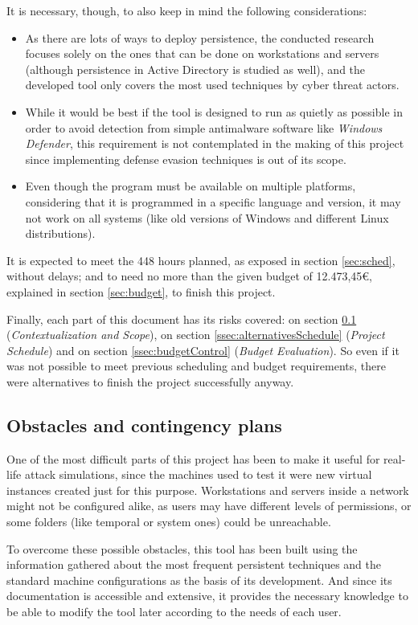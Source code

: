 It is necessary, though, to also keep in mind the following considerations:
\begin{itemize}
\item As there are lots of ways to deploy persistence, the conducted research focuses solely on the ones that can be done on workstations and servers (although persistence in Active Directory is studied as well), and the developed tool only covers the most used techniques by cyber threat actors.
\item While it would be best if the tool is designed to run as quietly as possible in order to avoid detection from simple antimalware software like \textit{Windows Defender}, this requirement is not contemplated in the making of this project since implementing defense evasion techniques is out of its scope.
\item Even though the program must be available on multiple platforms, considering that it is programmed in a specific language and version, it may not work on all systems (like old versions of Windows and different Linux distributions).
\end{itemize}

It is expected to meet the 448 hours planned, as exposed in section \ref{sec:sched}, without delays; and to need no more than the given budget of 12.473,45€, explained in section \ref{sec:budget}, to finish this project.

Finally, each part of this document has its risks covered: on section \ref{ssec:obstacles} (\textit{Contextualization and Scope}), on section \ref{ssec:alternativesSchedule} (\textit{Project Schedule}) and on section \ref{ssec:budgetControl} (\textit{Budget Evaluation}). So even if it was not possible to meet previous scheduling and budget requirements, there were alternatives to finish the project successfully anyway.


\subsection{Obstacles and contingency plans}
\label{ssec:obstacles}
One of the most difficult parts of this project has been to make it useful for real-life attack simulations, since the machines used to test it were new virtual instances created just for this purpose.
Workstations and servers inside a network might not be configured alike, as users may have different levels of permissions, or some folders (like temporal or system ones) could be unreachable.

To overcome these possible obstacles, this tool has been built using the information gathered about the most frequent persistent techniques and the standard machine configurations as the basis of its development. And since its documentation is accessible and extensive, it provides the necessary knowledge to be able to modify the tool later according to the needs of each user.